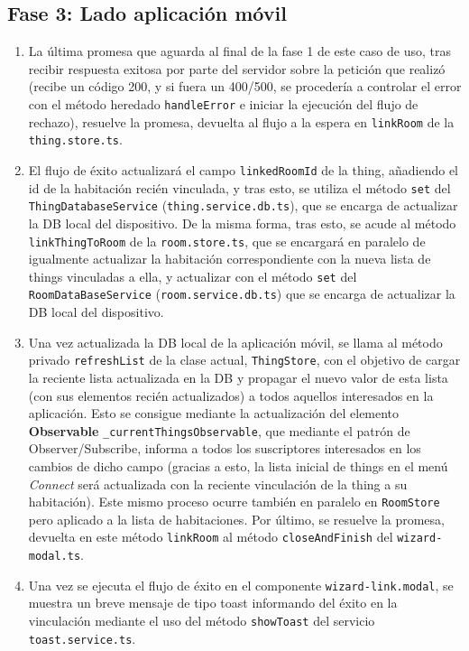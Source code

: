 \subsection{Fase 3: Lado aplicación móvil}
\label{ch:Capitulo5.2.3}
\begin{enumerate}
\item  La última promesa que aguarda al final de la fase 1 de este caso de uso, tras recibir respuesta exitosa por parte del servidor sobre la petición que realizó (recibe un código 200, y si fuera un 400/500, se procedería a controlar el error con el método heredado \verb|handleError| e iniciar la ejecución del flujo de rechazo), resuelve la promesa, devuelta al flujo a la espera en \verb|linkRoom| de la \verb|thing.store.ts|.

\item  El flujo de éxito actualizará el campo \verb|linkedRoomId| de la thing, añadiendo el id de la habitación recién vinculada, y tras esto, se utiliza el método \verb|set| del \verb|ThingDatabaseService| (\verb|thing.service.db.ts|), que se encarga de actualizar la DB local del dispositivo. De la misma forma, tras esto, se acude al método \verb|linkThingToRoom| de la \verb|room.store.ts|, que se encargará en paralelo de igualmente actualizar la habitación correspondiente con la nueva lista de things vinculadas a ella, y actualizar con el método \verb|set| del \verb|RoomDataBaseService| (\verb|room.service.db.ts|) que se encarga de actualizar la DB local del dispositivo.

\item  Una vez actualizada la DB local de la aplicación móvil, se llama al método privado \verb|refreshList| de la clase actual, \verb|ThingStore|, con el objetivo de cargar la reciente lista actualizada en la DB y propagar el nuevo valor de esta lista (con sus elementos recién actualizados) a todos aquellos interesados en la aplicación. Esto se consigue mediante la actualización del elemento \textbf{Observable} \verb|_currentThingsObservable|, que mediante el patrón de Observer/Subscribe, informa a todos los suscriptores interesados en los cambios de dicho campo (gracias a esto, la lista inicial de things en el menú \textit{Connect} será actualizada con la reciente vinculación de la thing a su habitación). Este mismo proceso ocurre también en paralelo en \verb|RoomStore| pero aplicado a la lista de habitaciones. Por último, se resuelve la promesa, devuelta en este método \verb|linkRoom| al método \verb|closeAndFinish| del \verb|wizard-modal.ts|. 

\item  Una vez se ejecuta el flujo de éxito en el componente \verb|wizard-link.modal|, se muestra un breve mensaje de tipo toast informando del éxito en la vinculación mediante el uso del método \verb|showToast| del servicio \verb|toast.service.ts|.
\end{enumerate}

